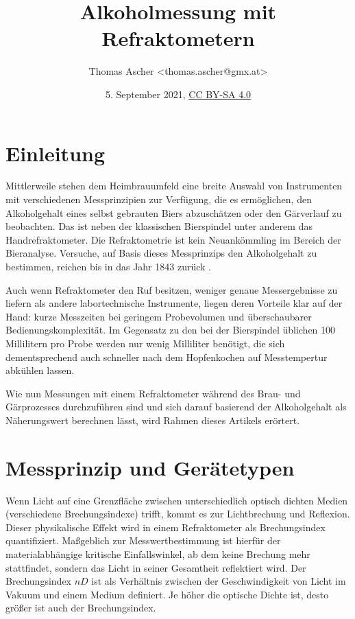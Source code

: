\documentclass[a4paper,parskip=half]{scrartcl}
\title{Alkoholmessung mit Refraktometern}
\author{Thomas Ascher <thomas.ascher@gmx.at>}
\date{5. September 2021, \href{http://creativecommons.org/licenses/by-sa/4.0/}{CC BY-SA 4.0}}
\begin{document}
\maketitle

\section*{Einleitung}

Mittlerweile stehen dem Heimbrauumfeld eine breite Auswahl von Instrumenten
mit verschiedenen Messprinzipien zur Verfügung, die es ermöglichen, den
Alkoholgehalt eines selbst gebrauten Biers abzuschätzen oder den
Gärverlauf zu beobachten. Das ist neben der klassischen Bierspindel
unter anderem das Handrefraktometer. Die Refraktometrie ist
kein Neuankömmling im Bereich der Bieranalyse. Versuche,
auf Basis dieses Messprinzips den Alkoholgehalt zu bestimmen, reichen bis
in das Jahr 1843 zurück \autocite{Gamer1959}.

Auch wenn Refraktometer den Ruf besitzen, weniger genaue Messergebnisse
zu liefern als andere labortechnische Instrumente, liegen deren
Vorteile klar auf der Hand: kurze Messzeiten bei geringem Probevolumen
und überschaubarer Bedienungskomplexität. Im Gegensatz zu den bei der
Bierspindel üblichen 100 Millilitern pro Probe werden nur wenig
Milliliter benötigt, die sich dementsprechend auch schneller nach dem
Hopfenkochen auf Messtempertur abkühlen lassen. \autocite{Bettner1969, Terrill2011}

Wie nun Messungen mit einem Refraktometer während des Brau- und
Gärprozesses durchzuführen sind und sich darauf basierend der
Alkoholgehalt als Näherungswert berechnen lässt, wird
Rahmen dieses Artikels erörtert.

\section*{Messprinzip und Gerätetypen}

Wenn Licht auf eine Grenzfläche zwischen unterschiedlich optisch
dichten Medien (verschiedene Brechungsindexe) trifft,
kommt es zur Lichtbrechung und Reflexion. Dieser physikalische Effekt
wird in einem Refraktometer als Brechungsindex quantifiziert.
Maßgeblich zur Messwertbestimmung ist hierfür der materialabhängige
kritische Einfallswinkel, ab dem keine Brechung mehr stattfindet,
sondern das Licht in seiner Gesamtheit reflektiert wird.
Der Brechungsindex \(\mathit{nD}\) ist als Verhältnis zwischen der
Geschwindigkeit von Licht im Vakuum und einem Medium definiert. Je höher
die optische Dichte ist, desto größer ist auch der Brechungsindex.
\autocite{AKRSSOGH2021,Bonham2001,Gamer1959}
\end{document}
